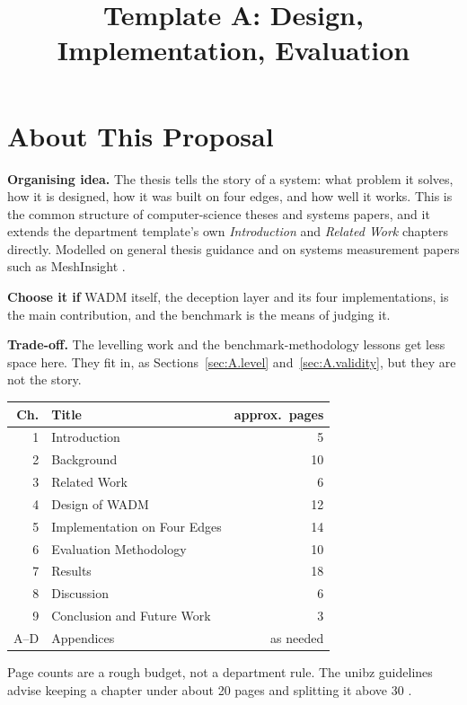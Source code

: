 \documentclass{rptuma}
\title{Template A: Design, Implementation, Evaluation}
\begin{document}
\maketitle
{}
\setcounter{page}{1}

\chapter*{About This Proposal}

\textbf{Organising idea.} The thesis tells the story of a system: what problem it solves, how
it is designed, how it was built on four edges, and how well it works. This is the common
structure of computer-science theses and systems papers, and it extends the department
template's own \emph{Introduction} and \emph{Related Work} chapters directly. Modelled on
general thesis guidance \cite{intille_thesis,unibz_guidelines} and on systems measurement
papers such as MeshInsight \cite{zhu2022dissecting}.

\textbf{Choose it if} WADM itself, the deception layer and its four implementations, is the
main contribution, and the benchmark is the means of judging it.

\textbf{Trade-off.} The levelling work and the benchmark-methodology lessons get less space here.
They fit in, as Sections~\ref{sec:A.level} and~\ref{sec:A.validity}, but they are not the
story.

\begin{center}
\small
\begin{tabularx}{\textwidth}{@{}rXr@{}}
\toprule
Ch. & Title & approx.\ pages \\
\midrule
1 & Introduction & 5 \\
2 & Background & 10 \\
3 & Related Work & 6 \\
4 & Design of WADM & 12 \\
5 & Implementation on Four Edges & 14 \\
6 & Evaluation Methodology & 10 \\
7 & Results & 18 \\
8 & Discussion & 6 \\
9 & Conclusion and Future Work & 3 \\
A--D & Appendices & as needed \\
\bottomrule
\end{tabularx}
\end{center}
{\footnotesize Page counts are a rough budget, not a department rule. The unibz guidelines
advise keeping a chapter under about 20 pages and splitting it above 30 \cite{unibz_guidelines}.}
\end{document}
